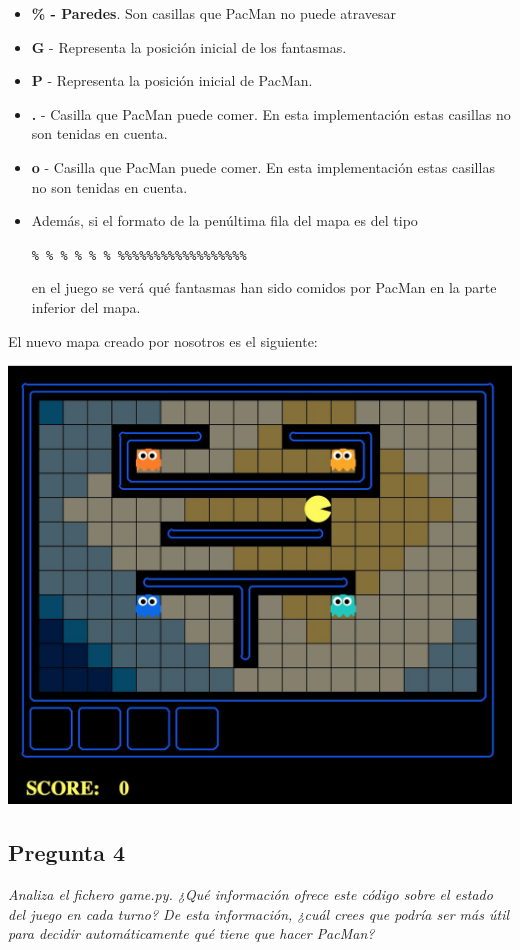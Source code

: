\documentclass[12pt]{article}
\begin{document}
\begin{itemize}
    \item \textbf{\% - Paredes}. Son casillas que PacMan no puede atravesar
    \item \textbf{G} - Representa la posición inicial de los fantasmas.
    \item \textbf{P} - Representa la posición inicial de PacMan.
    \item \textbf{.} - Casilla que PacMan puede comer. En esta implementación
    estas casillas no son tenidas en cuenta.
    \item \textbf{o} - Casilla que PacMan puede comer. En esta implementación
    estas casillas no son tenidas en cuenta.
    \item Además, si el formato de la penúltima fila del mapa es del tipo \\
    \centerline{\texttt{\% \% \% \% \% \% \%\%\%\%\%\%\%\%\%\%\%\%\%\%\%\%\%\%}}
    en el juego se verá qué
    fantasmas han sido comidos por PacMan en la parte inferior del mapa.
\end{itemize}

El nuevo mapa creado por nosotros es el siguiente:\\
\begin{center}
    \vspace{-17pt}
    \includegraphics[scale=0.25]{map.jpg}
\end{center}

\newpage
\begin{center}
\section{Pregunta 4}

\emph{Analiza el fichero game.py. ¿Qué información ofrece este código sobre el
estado del juego en cada turno? De esta información, ¿cuál crees que podría
ser más útil para decidir automáticamente qué tiene que hacer PacMan?}
\end{center}
\end{document}
